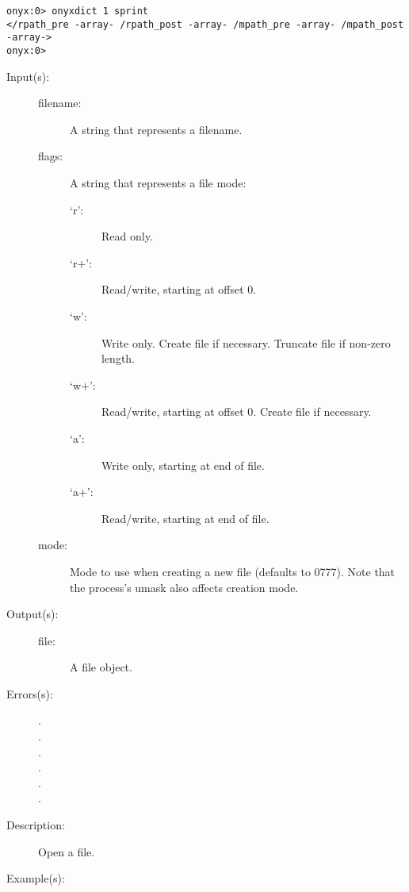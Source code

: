 \begin{description}
\begin{description}
\begin{verbatim}
onyx:0> onyxdict 1 sprint
</rpath_pre -array- /rpath_post -array- /mpath_pre -array- /mpath_post -array->
onyx:0>
		\end{verbatim}
	\end{description}
\label{systemdict:open}
\item[{\onyxop{filename flags}{open}{file}}: ]
\item[{\onyxop{filename flags mode}{open}{file}}: ]
	\begin{description}\item[]
	\item[Input(s): ]
		\begin{description}\item[]
		\item[filename: ]
			A string that represents a filename.
		\item[flags: ]
			A string that represents a file mode:
			\begin{description}\item[]
			\item[`r': ]
				Read only.
			\item[`r+': ]
				Read/write, starting at offset 0.
			\item[`w': ]
				Write only.  Create file if necessary.  Truncate
				file if non-zero length.
			\item[`w+': ]
				Read/write, starting at offset 0.  Create
				file if necessary.
			\item[`a': ]
				Write only, starting at end of file.
			\item[`a+': ]
				Read/write, starting at end of file.
			\end{description}
		\item[mode: ]
			Mode to use when creating a new file (defaults to 0777).
			Note that the process's umask also affects creation
			mode.
		\end{description}
	\item[Output(s): ]
		\begin{description}\item[]
		\item[file: ]
			A file object.
		\end{description}
	\item[Errors(s): ]
		\begin{description}\item[]
		\item[.]
		\item[.]
		\item[.]
		\item[.]
		\item[.]
		\item[.]
		\end{description}
	\item[Description: ]
		Open a file.
	\item[Example(s): ]\begin{verbatim}


\end{verbatim}
\end{description}
\end{description}

